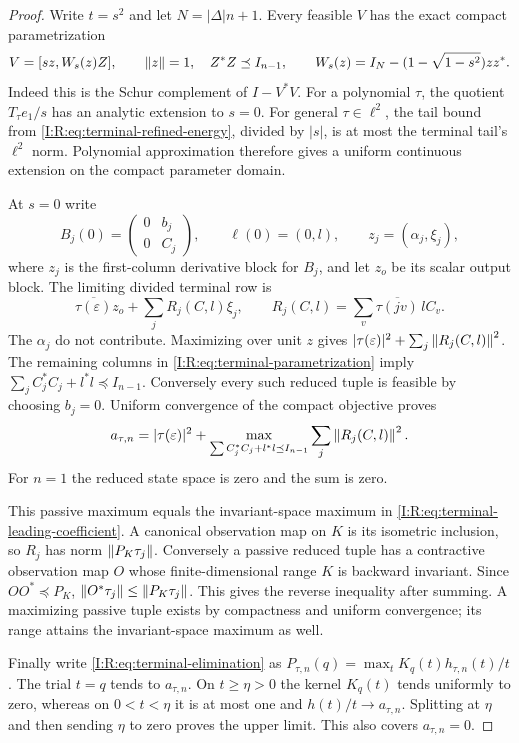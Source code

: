 \begin{proof}
Write $t=s^2$ and let $N=|\Delta|n+1$.  Every feasible $V$ has the
exact compact parametrization
\begin{equation}
 V=[sz,W_s(z)Z],\qquad
 \left\lVert z\right\rVert=1,\quad Z^*Z\preceq I_{n-1},\qquad
 W_s(z)=I_N-(1-\sqrt{1-s^2})zz^*.
 \label{I:R:eq:terminal-parametrization}
\end{equation}
Indeed this is the Schur complement of $I-V^*V$.  For a polynomial
$\tau$, the quotient $T_\tau e_1/s$ has an analytic extension to
$s=0$.  For general $\tau\in\ell^2$, the tail bound from
\eqref{I:R:eq:terminal-refined-energy}, divided by $|s|$, is at most
the terminal tail's $\ell^2$ norm.  Polynomial approximation therefore
gives a uniform continuous extension on the compact parameter domain.

At $s=0$ write
\[
 B_j(0)=\begin{pmatrix}0&b_j\\0&C_j\end{pmatrix},\qquad
 \ell(0)=(0,l),\qquad z_j=(\alpha_j,\xi_j),
\]
where $z_j$ is the first-column derivative block for $B_j$, and let
$z_o$ be its scalar output block.  The limiting divided terminal row is
\begin{equation}
 \overline{\tau(\varepsilon)}z_o+
 \sum_j R_j(C,l)\xi_j,
 \qquad
 R_j(C,l)=\sum_v\overline{\tau(jv)}\,lC_v.
 \label{I:R:eq:terminal-divided-limit}
\end{equation}
The $\alpha_j$ do not contribute.  Maximizing over unit $z$ gives
$|\tau(\varepsilon)|^2+\sum_j\left\lVert R_j(C,l)\right\rVert^2$.
The remaining columns in \eqref{I:R:eq:terminal-parametrization} imply
$\sum_j C_j^*C_j+l^*l\preceq I_{n-1}$.  Conversely every such reduced
tuple is feasible by choosing $b_j=0$.  Uniform convergence of the
compact objective proves
\[
 a_{\tau,n}=|\tau(\varepsilon)|^2+
 \max_{\sum C_j^*C_j+l^*l\preceq I_{n-1}}
                    \sum_j\left\lVert R_j(C,l)\right\rVert^2.
\]
For $n=1$ the reduced state space is zero and the sum is zero.

This passive maximum equals the invariant-space maximum in
\eqref{I:R:eq:terminal-leading-coefficient}.  A canonical observation map
on $K$ is its isometric inclusion, so $R_j$ has norm
$\left\lVert P_K\tau_j\right\rVert$.  Conversely a passive reduced tuple has a
contractive observation map $O$ whose finite-dimensional range $K$ is
backward invariant.  Since $OO^*\preceq P_K$,
$\left\lVert O^*\tau_j\right\rVert\le\left\lVert P_K\tau_j\right\rVert$.  This gives the reverse
inequality after summing.  A maximizing passive tuple exists by
compactness and uniform convergence; its range attains the
invariant-space maximum as well.

Finally write \eqref{I:R:eq:terminal-elimination} as
$P_{\tau,n}(q)=\max_t K_q(t)h_{\tau,n}(t)/t$.
The trial $t=q$ tends to $a_{\tau,n}$.  On $t\ge\eta>0$ the kernel
$K_q(t)$ tends uniformly to zero, whereas on $0<t<\eta$ it is at most
one and $h(t)/t\to a_{\tau,n}$.  Splitting at $\eta$ and then sending
$\eta$ to zero proves the upper limit.  This also covers
$a_{\tau,n}=0$.
\end{proof}
